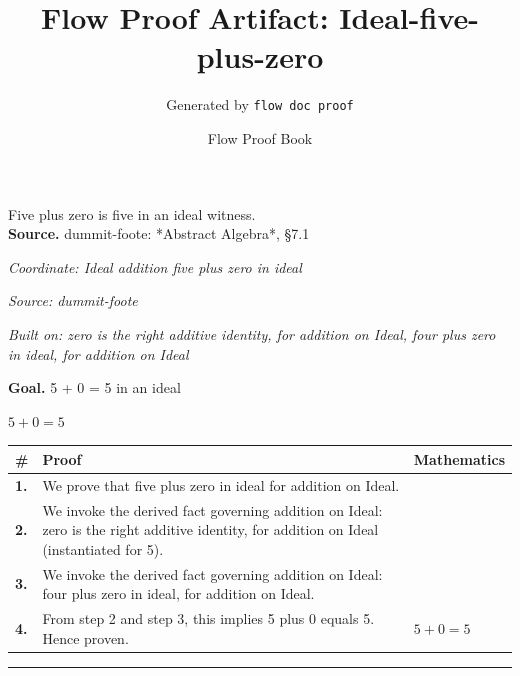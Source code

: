 \documentclass[11pt]{article}
\title{Flow Proof Artifact: Ideal-five-plus-zero}
\author{Generated by \texttt{flow doc proof}}
\date{Flow Proof Book}
\theoremstyle{definition}
\begin{document}
\maketitle
Five plus zero is five in an ideal witness.\\[0.5em]
\textbf{Source.} dummit-foote: *Abstract Algebra*, §7.1\\[0.5em]
\bigskip
{}\par
\smallskip\noindent\textit{Coordinate: Ideal \cdot addition \cdot five plus zero in ideal}\par
\smallskip\noindent\textit{Source: dummit-foote}\par
\smallskip\noindent\textit{Built on: zero is the right additive identity, for addition on Ideal, four plus zero in ideal, for addition on Ideal}\par
\medskip
\noindent\textbf{Goal.} 5 + 0 = 5 in an ideal\par
\noindent$\displaystyle 5 + 0 = 5$\par
\medskip
\noindent
\begin{tabular}{@{} >{\raggedright\arraybackslash}p{} >{\raggedright\arraybackslash}p{} >{\raggedleft\arraybackslash}p{} @{}}
\textbf{\#} & \textbf{Proof} & \textbf{Mathematics} \\
\midrule
\textbf{1.} & We prove that five plus zero in ideal for addition on Ideal. & \\[0.45em]
\textbf{2.} & We invoke the derived fact governing addition on Ideal: zero is the right additive identity, for addition on Ideal (instantiated for 5). & \\[0.45em]
\textbf{3.} & We invoke the derived fact governing addition on Ideal: four plus zero in ideal, for addition on Ideal. & \\[0.45em]
\textbf{4.} & From step 2 and step 3, this implies 5 plus 0 equals 5. Hence proven. & $\displaystyle 5 + 0 = 5$ \\[0.45em]
\bottomrule
\end{tabular}
\label{thm:Ideal-addition-five_plus_zero_in_ideal}
\par\medskip\hrule
\end{document}
